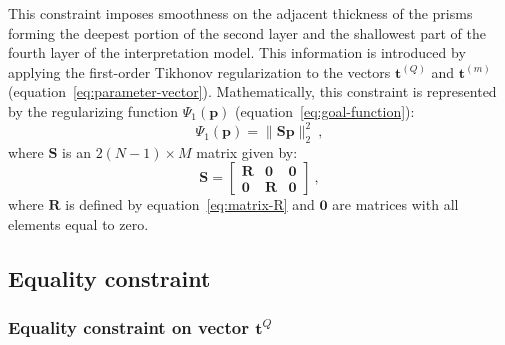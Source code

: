 \documentclass[manuscript]{geophysics}
\begin{document}
This constraint imposes smoothness on the adjacent thickness of the prisms forming the
deepest portion of the second layer and the shallowest part of the fourth layer
of the interpretation model. 
This information is introduced by applying the first-order Tikhonov regularization
\citep{aster-etal2005} to the vectors $\mathbf{t}^{(Q)}$ and $\mathbf{t}^{(m)}$ 
(equation~\ref{eq:parameter-vector}). 
Mathematically, this constraint is represented by the regularizing function
$\Psi_{1}(\mathbf{p})$ (equation~\ref{eq:goal-function}):
\begin{equation}
\Psi_{1}(\mathbf{p}) = \| \mathbf{S}\mathbf{p} \|_{2}^{2} \: ,
\label{eq:smootheness-contraint}
\end{equation}
where $\mathbf{S}$ is an $2 \left( N-1 \right) \times M$ matrix given by:
\begin{equation}
\mathbf{S} = \begin{bmatrix}
\mathbf{R} & \mathbf{0} & \mathbf{0} \\
\mathbf{0} & \mathbf{R} & \mathbf{0}
\end{bmatrix} \: ,
\label{eq:matrix-S}
\end{equation}
where $\mathbf{R}$ is defined by equation~\ref{eq:matrix-R} and $\mathbf{0}$
are matrices with all elements equal to zero.


\subsection{Equality constraint}

\subsubsection*{Equality constraint on vector $\mathbf{t}^{Q}$}
\end{document}

